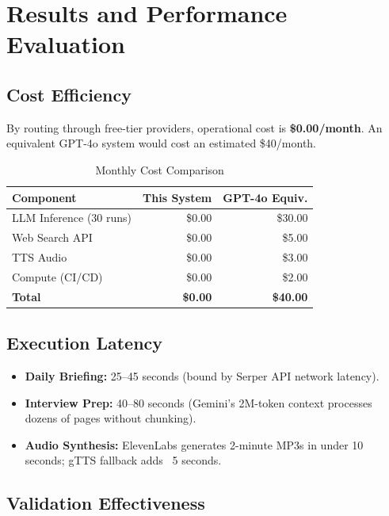\documentclass[12pt,a4paper]{report}
\begin{document}
\chapter{Results and Performance Evaluation}

\section{Cost Efficiency}
By routing through free-tier providers, operational cost is \textbf{\$0.00/month}. An equivalent GPT-4o system would cost an estimated \$40/month.

\begin{table}[htbp]
\caption{Monthly Cost Comparison}
\centering
\begin{tabular}{@{}lrr@{}}
\toprule
\textbf{Component} & \textbf{This System} & \textbf{GPT-4o Equiv.} \\
\midrule
LLM Inference (30 runs) & \$0.00 & \$30.00 \\
Web Search API & \$0.00 & \$5.00 \\
TTS Audio & \$0.00 & \$3.00 \\
Compute (CI/CD) & \$0.00 & \$2.00 \\
\midrule
\textbf{Total} & \textbf{\$0.00} & \textbf{\$40.00} \\
\bottomrule
\end{tabular}
\end{table}

\section{Execution Latency}
\begin{itemize}
    \item \textbf{Daily Briefing:} 25--45 seconds (bound by Serper API network latency).
    \item \textbf{Interview Prep:} 40--80 seconds (Gemini's 2M-token context processes dozens of pages without chunking).
    \item \textbf{Audio Synthesis:} ElevenLabs generates 2-minute MP3s in under 10 seconds; gTTS fallback adds ~5 seconds.
\end{itemize}

\section{Validation Effectiveness}
\end{document}
